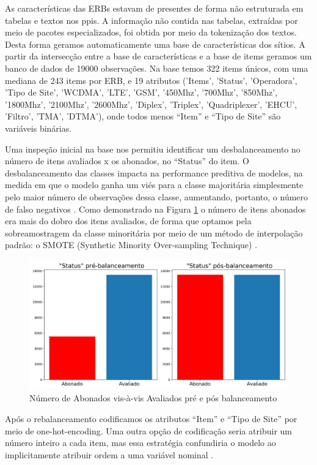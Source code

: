 \documentclass[
	12pt,				%
	openany,			%
	oneside,			%
	a4paper,			%
	english,			%
	french,				%
	spanish,			%
	brazil,				%
	]{abntex2}
\begin{document}
As características das ERBs estavam de presentes de forma não estruturada em
tabelas e textos nos ppis. A informação não contida nas tabelas, extraídas por
meio de pacotes especializados, foi obtida por meio da tokenização dos textos.
Desta forma geramos automaticamente uma base de características dos sítios. A
partir da intersecção entre a base de características e a base de items geramos
um banco de dados de 19000 observações. Na base temos 322 items únicos, com uma
mediana de 243 items por ERB, e 19 atributos ('Items', 'Status', 'Operadora',
'Tipo de Site', 'WCDMA', 'LTE', 'GSM', '450Mhz', '700Mhz', '850Mhz', '1800Mhz',
'2100Mhz', '2600Mhz', 'Diplex', 'Triplex', 'Quadriplexer', 'EHCU', 'Filtro',
'TMA', 'DTMA'), onde todos menos ``Item'' e ``Tipo de Site'' são variáveis
binárias.

Uma inspeção inicial na base nos permitiu identificar um desbalanceamento no
número de itens avaliados x os abonados, no ``Status'' do item. O
desbalanceamento das classes impacta na performance preditiva de modelos, na
medida em que o modelo ganha um viés para a classe majoritária simplesmente pelo
maior número de observações dessa classe, aumentando, portanto, o número de
falso negativos \cite{faceli2011inteligencia}. Como demonstrado na Figura
\ref{ref:figbal} o número de itens abonados era mais do dobro dos itens
avaliados, de forma que optamos pela sobreamostragem da classe minoritária por
meio de um método de interpolação padrão: o SMOTE (Synthetic Minority
Over-sampling Technique) \cite{chawla2002smote}. 

\begin{figure}[h]
  \includegraphics[scale=0.5]{img/balanceamento.png}
  \caption{Número de Abonados vis-à-vis Avaliados pré e pós balanceamento}
  \label{ref:figbal}
\end{figure}

Após o rebalanceamento codificamos os atributos ``Item'' e ``Tipo de Site'' por
meio de one-hot-encoding. Uma outra opção de codificação seria atribuir um
número inteiro a cada item, mas essa estratégia confundiria o modelo ao
implicitamente atribuir ordem a uma variável nominal
\cite{faceli2011inteligencia}.
\end{document}
